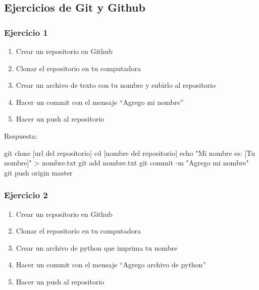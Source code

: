 \documentclass[
  a4paper,
  DIV=11,
  numbers=noendperiod,
  onepage,
  openany]{scrreprt}
\newenvironment{Shaded}{\begin{snugshade}}{\end{snugshade}}
\newcommand{\AttributeTok}[1]{\textcolor[rgb]{0.40,0.45,0.13}{#1}}
\newcommand{\BuiltInTok}[1]{\textcolor[rgb]{0.00,0.23,0.31}{#1}}
\newcommand{\FunctionTok}[1]{\textcolor[rgb]{0.28,0.35,0.67}{#1}}
\newcommand{\NormalTok}[1]{\textcolor[rgb]{0.00,0.23,0.31}{#1}}
\newcommand{\OperatorTok}[1]{\textcolor[rgb]{0.37,0.37,0.37}{#1}}
\newcommand{\StringTok}[1]{\textcolor[rgb]{0.13,0.47,0.30}{#1}}
\providecommand{\tightlist}{%
  \setlength{\itemsep}{0pt}\setlength{\parskip}{0pt}}\usepackage{longtable,booktabs,array}
\begin{document}
\begin{tcolorbox}
\chapter{Ejercicios de Git y Github}\label{ejercicios-de-git-y-github}

\subsection{Ejercicio 1}\label{ejercicio-1-1}

\begin{enumerate}
\def\labelenumi{\arabic{enumi}.}
\tightlist
\item
  Crear un repositorio en Github
\item
  Clonar el repositorio en tu computadora
\item
  Crear un archivo de texto con tu nombre y subirlo al repositorio
\item
  Hacer un commit con el mensaje ``Agrego mi nombre''
\item
  Hacer un push al repositorio
\end{enumerate}

Respuesta:

\begin{Shaded}
\begin{Highlighting}[]
\FunctionTok{git}\NormalTok{ clone [url del repositorio]}
\BuiltInTok{cd}\NormalTok{ [nombre del repositorio]}
\BuiltInTok{echo} \StringTok{"Mi nombre es: [Tu nombre]"} \OperatorTok{\textgreater{}}\NormalTok{ nombre.txt}
\FunctionTok{git}\NormalTok{ add nombre.txt}
\FunctionTok{git}\NormalTok{ commit }\AttributeTok{{-}m} \StringTok{"Agrego mi nombre"}
\FunctionTok{git}\NormalTok{ push origin master}
\end{Highlighting}
\end{Shaded}

\subsection{Ejercicio 2}\label{ejercicio-2}

\begin{enumerate}
\def\labelenumi{\arabic{enumi}.}
\tightlist
\item
  Crear un repositorio en Github
\item
  Clonar el repositorio en tu computadora
\item
  Crear un archivo de python que imprima tu nombre
\item
  Hacer un commit con el mensaje ``Agrego archivo de python''
\item
  Hacer un push al repositorio
\end{enumerate}


\end{tcolorbox}
\end{document}
